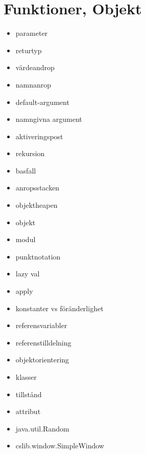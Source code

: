\chapter{Funktioner, Objekt}\label{chapter:W03}
\begin{itemize}[nosep]
\item parameter
\item returtyp
\item värdeandrop
\item namnanrop
\item default-argument
\item namngivna argument
\item aktiveringspost
\item rekursion
\item basfall
\item anropsstacken
\item objektheapen
\item objekt
\item modul
\item punktnotation
\item lazy val
\item apply
\item konstanter vs föränderlighet
\item referensvariabler
\item referenstilldelning
\item objektorientering
\item klasser
\item tillstånd
\item attribut
\item java.util.Random
\item cslib.window.SimpleWindow
\end{itemize}